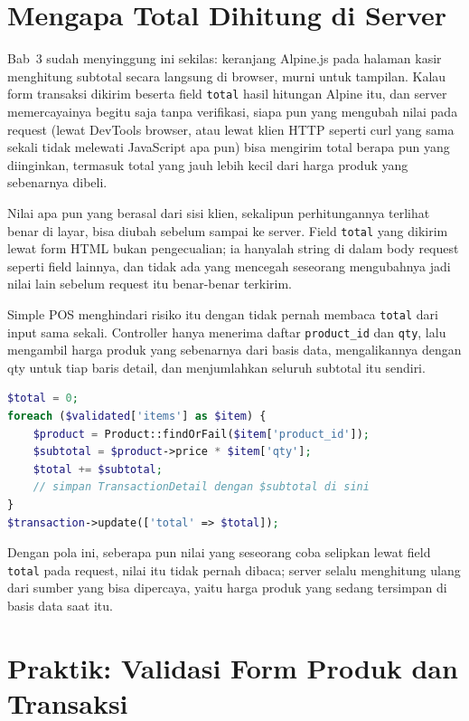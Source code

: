 \section{Mengapa Total Dihitung di Server}
\label{sec:validasi-input-2}

Bab~3 sudah menyinggung ini sekilas: keranjang Alpine.js pada halaman
kasir menghitung subtotal secara langsung di browser, murni untuk
tampilan. Kalau form transaksi dikirim beserta field \texttt{total}
hasil hitungan Alpine itu, dan server memercayainya begitu saja tanpa
verifikasi, siapa pun yang mengubah nilai pada request (lewat DevTools
browser, atau lewat klien HTTP seperti curl yang sama sekali tidak
melewati JavaScript apa pun) bisa mengirim total berapa pun yang
diinginkan, termasuk total yang jauh lebih kecil dari harga produk yang
sebenarnya dibeli.

\begin{warningbox}
Nilai apa pun yang berasal dari sisi klien, sekalipun perhitungannya
terlihat benar di layar, bisa diubah sebelum sampai ke server. Field
\texttt{total} yang dikirim lewat form HTML bukan pengecualian; ia
hanyalah string di dalam body request seperti field lainnya, dan tidak
ada yang mencegah seseorang mengubahnya jadi nilai lain sebelum request
itu benar-benar terkirim.
\end{warningbox}

Simple POS menghindari risiko itu dengan tidak pernah membaca
\texttt{total} dari input sama sekali. Controller hanya menerima daftar
\texttt{product\_id} dan \texttt{qty}, lalu mengambil harga produk yang
sebenarnya dari basis data, mengalikannya dengan qty untuk tiap baris
detail, dan menjumlahkan seluruh subtotal itu sendiri.

\begin{lstlisting}[language=php]
$total = 0;
foreach ($validated['items'] as $item) {
    $product = Product::findOrFail($item['product_id']);
    $subtotal = $product->price * $item['qty'];
    $total += $subtotal;
    // simpan TransactionDetail dengan $subtotal di sini
}
$transaction->update(['total' => $total]);
\end{lstlisting}

Dengan pola ini, seberapa pun nilai yang seseorang coba selipkan lewat
field \texttt{total} pada request, nilai itu tidak pernah dibaca; server
selalu menghitung ulang dari sumber yang bisa dipercaya, yaitu harga
produk yang sedang tersimpan di basis data saat itu.

\section{Praktik: Validasi Form Produk dan Transaksi}
\label{sec:validasi-input-3}


